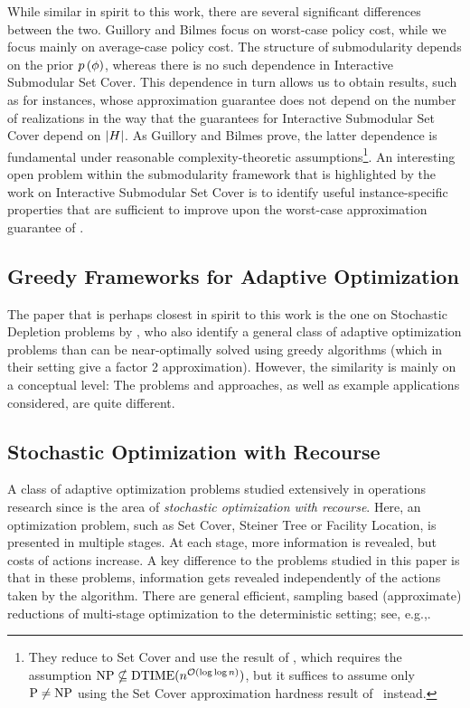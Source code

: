 While similar in spirit to this work, there are several significant
differences between the two. 
Guillory and Bilmes focus on worst-case
policy cost, while we focus mainly on average-case policy cost.  
The structure of \term submodularity depends on the prior ${\color{black}{\ensuremath{p \left( {{\color{black}{\ensuremath{\phi}}}} \right) }}}$, whereas
there is no such dependence 
in Interactive Submodular Set Cover.
%
This dependence in turn allows us to obtain results, such as 
 for \certifying instances,
whose approximation guarantee does not depend on the number of
realizations in the way that the guarantees for  Interactive
Submodular Set Cover depend on $|H|$.  As 
Guillory and Bilmes
prove, the latter dependence
is fundamental under reasonable complexity-theoretic assumptions\footnote{They
  reduce to Set Cover and use the result of \citet{feige98threshold},
  which requires the assumption 
$\textrm{NP} \nsubseteq \text{DTIME}(n^{{\mathcal{O}}(\log\log n)})$, but it suffices to
assume only $\textrm{P} \neq \textrm{NP}$ using the Set Cover approximation hardness
result of~\citet{RazS97} instead.}. 
An interesting open problem within the \term submodularity framework
that is highlighted by the work on  Interactive Submodular Set Cover
is to identify useful instance-specific properties that  
are sufficient to improve upon the worst-case approximation guarantee of 
.



\subsection{Greedy Frameworks for Adaptive Optimization} The paper
that is perhaps 
closest in spirit to this work is the one on Stochastic Depletion problems by \citet{chan09}, who also identify a general class of adaptive optimization problems than can be near-optimally solved using greedy algorithms (which in their setting give a factor 2 approximation). 
However, the similarity is mainly on a conceptual level: The problems and approaches, as well as example applications considered, are quite different. 


\subsection{Stochastic Optimization with Recourse} A class of adaptive
optimization problems  studied extensively in operations research
since \citet{dantzig55linear} is the area of \emph{stochastic optimization with recourse}. Here, an optimization problem, such as Set Cover, Steiner Tree or Facility Location, is presented in multiple stages. At each stage, more information is revealed, but costs of actions increase.  A key difference to the problems studied in this paper is that in these problems, information gets revealed independently of the actions taken by the algorithm. There are general efficient, sampling based (approximate) reductions of multi-stage optimization to the deterministic setting; see, e.g.,\citet{gupta05wednesday}.


